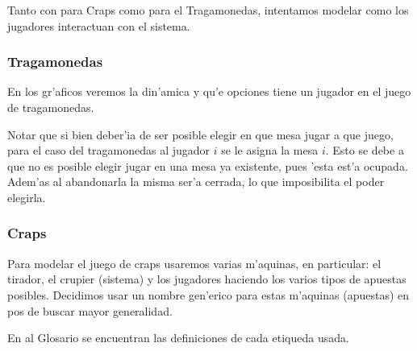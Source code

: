 
\newcommand{\ronda}{ \italica{ FSM Ronda} }
\newcommand{\crupier}{ \italica{ FSM Crupier} }
\newcommand{\tirador}{ \italica{ FSM tirador i} }
\newcommand{\unaRonda}{\italica{FSM Jugador i haciendo apuestas de \textbf{una ronda}}}
\newcommand{\muchasRondas}{\italica{FSM Jugador i haciendo apuestas en\textbf{ m'as de una ronda}}}
\newcommand{\unTiro}{\italica{FSM Jugador i haciendo apuestas de \textbf{un tiro}}}
Tanto con para Craps como para el Tragamonedas, intentamos modelar como los jugadores interactuan con el sistema.

\subsubsection{Tragamonedas}

En los gr'aficos veremos la din'amica y qu'e opciones tiene un jugador en el juego de tragamonedas.

Notar que si bien deber'ia de ser posible elegir en que mesa jugar a que juego, para el caso del tragamonedas al jugador $i$ se le asigna la mesa $i$. Esto se debe a que no es posible elegir jugar en una mesa ya existente, pues 'esta est'a ocupada. Adem'as al abandonarla la misma ser'a cerrada, lo que imposibilita el poder elegirla.

\clearpage


\subsubsection{Craps}
\label{FSM:Craps}
Para modelar el juego de craps usaremos varias m'aquinas, en particular:
el tirador, el crupier (sistema) y los jugadores haciendo los varios tipos de apuestas
posibles. Decidimos usar un nombre gen'erico para estas m'aquinas (apuestas) en pos de buscar mayor generalidad.

En al Glosario se encuentran las definiciones de cada etiqueda usada.


